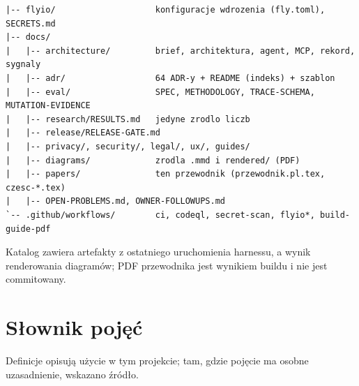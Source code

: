 \begin{Verbatim}[fontsize=\footnotesize]
|-- flyio/                    konfiguracje wdrozenia (fly.toml), SECRETS.md
|-- docs/
|   |-- architecture/         brief, architektura, agent, MCP, rekord, sygnaly
|   |-- adr/                  64 ADR-y + README (indeks) + szablon
|   |-- eval/                 SPEC, METHODOLOGY, TRACE-SCHEMA, MUTATION-EVIDENCE
|   |-- research/RESULTS.md   jedyne zrodlo liczb
|   |-- release/RELEASE-GATE.md
|   |-- privacy/, security/, legal/, ux/, guides/
|   |-- diagrams/             zrodla .mmd i rendered/ (PDF)
|   |-- papers/               ten przewodnik (przewodnik.pl.tex, czesc-*.tex)
|   |-- OPEN-PROBLEMS.md, OWNER-FOLLOWUPS.md
`-- .github/workflows/        ci, codeql, secret-scan, flyio*, build-guide-pdf
\end{Verbatim}

Katalog  zawiera artefakty z ostatniego uruchomienia harnessu, a  wynik renderowania diagramów; PDF przewodnika jest wynikiem buildu i nie jest commitowany.

\section{Słownik pojęć}
\label{sec:p4-slownik}

Definicje opisują użycie w tym projekcie; tam, gdzie pojęcie ma osobne uzasadnienie, wskazano źródło.

